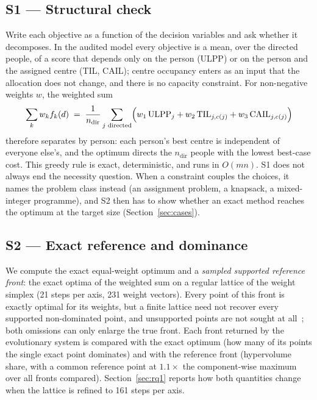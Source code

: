 \documentclass[systems,article,submit,moreauthors,pdftex]{Definitions/mdpi}
\begin{document}
\subsection{S1 --- Structural check}
Write each objective as a function of the decision variables and ask whether it
decomposes. In the audited model every objective is a mean, over the directed people, of a
score that depends only on the person (ULPP) or on the person and the assigned centre (TIL,
CAIL); centre occupancy enters as an input that the allocation does not change, and there
is no capacity constraint. For non-negative weights $w$, the weighted sum
\begin{equation}
\sum_k w_k f_k(d) \;=\; \frac{1}{n_{\mathrm{dir}}}\sum_{j \text{ directed}}
\Bigl(w_1\,\mathrm{ULPP}_j + w_2\,\mathrm{TIL}_{j,c(j)} + w_3\,\mathrm{CAIL}_{j,c(j)}\Bigr)
\end{equation}
therefore separates by person: each person's best centre is independent of everyone
else's, and the optimum directs the $n_{\mathrm{dir}}$ people with the lowest best-case
cost. This greedy rule is exact, deterministic, and runs in $O(mn)$. S1 does not always end
the necessity question. When a constraint couples the choices, it names the problem class
instead (an assignment problem, a knapsack, a mixed-integer programme), and S2 then has to
show whether an exact method reaches the optimum at the target size (Section~\ref{sec:cases}).

\subsection{S2 --- Exact reference and dominance}
We compute the exact equal-weight optimum and a \emph{sampled supported reference front}: the
exact optima of the weighted sum on a regular lattice of the weight simplex (21 steps per
axis, 231 weight vectors). Every point of this front is exactly optimal for its weights, but
a finite lattice need not recover every supported non-dominated point, and unsupported points
are not sought at all~\cite{ehrgott2005multicriteria}; both omissions can only enlarge the true
front. Each front returned by the evolutionary system is compared with the exact optimum (how
many of its points the single exact point dominates) and with the reference front
(hypervolume share, with a common reference point at $1.1\times$ the component-wise maximum
over all fronts compared). Section~\ref{sec:rq1} reports how both quantities change when the
lattice is refined to 161 steps per axis.
\end{document}
